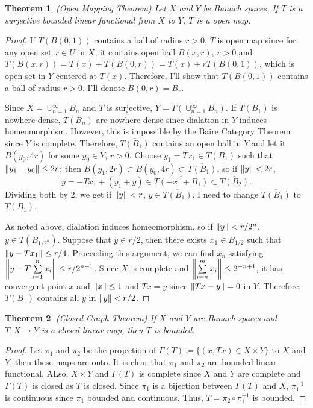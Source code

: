 \documentclass{article}
\newtheorem{theorem}{Theorem}
\begin{document}
\begin{theorem}
(Open Mapping Theorem) Let $X$ and $Y$ be Banach spaces. If $T$ is a surjective bounded linear functional from $X$ to $Y$, $T$ is a open map.
\end{theorem}
\begin{proof}
If $T(B(0, 1))$ contains a ball of radius $r>0$, $T$ is open map since for any open set $x\in U$ in $X$, it contains open ball $B(x,r)$, $r>0$ and $T(B(x,r))=T(x)+T(B(0, r))=T(x)+rT(B(0, 1))$, which is open set in $Y$ centered at $T(x)$. Therefore, I'll show that $T(B(0, 1))$ contains a ball of radius $r>0$. I'll denote $B(0,r)=B_r$.

Since $X=\cup_{n=1}^\infty B_n$ and $T$ is surjective, $Y=T(\cup_{n=1}^\infty B_n)$. If $T(B_1)$ is nowhere dense, $T(B_n)$ are nowhere dense since dialation in $Y$ induces homeomorphism. However, this is impossible by the Baire Category Theorem since $Y$ is complete. Therefore, $\overline{T(B_1)}$ contains an open ball in $Y$ and let it $B(y_0, 4r)$ for some $y_0\in Y$, $r>0$. Choose $y_1=Tx_1\in T(B_1)$ such that $\norm{y_1-y_0}\leq 2r$; then $B(y_1,2r)\subset B(y_0, 4r)\subset \overline{T(B_1)}$, so if $\norm{y}<2r$,
\begin{equation*}
y=-Tx_1+(y_1+y)\in \overline{T(-x_1+B_1)}\subset \overline{T(B_2)}.
\end{equation*}
Dividing both by $2$, we get if $\norm{y}<r$, $y\in \overline{T(B_1)}$. I need to change $\overline{T(B_1)}$ to $T(B_1)$.

As noted above, dialation induces homeomorphism, so if $\norm{y}<r/2^n$, $y\in \overline{T(B_{1/2^n})}$. Suppose that $y\in r/2$, then there exists $x_1\in B_{1/2}$ such that $\norm{y-Tx_1}\leq r/4$. Proceeding this argument, we can find $x_n$ satisfying $\norm{y-T\sum\limits_{i=1}^n x_i}\leq r/2^{n+1}$. Since $X$ is complete and $\norm{\sum\limits_{i=n}^m x_i}\leq 2^{-n+1}$, it has convergent point $x$ and $\norm{x}\leq 1$ and $Tx=y$ since $\norm{Tx-y}=0$ in $Y$. Therefore, $T(B_1)$ contains all $y$ in $\norm{y}<r/2$.
\end{proof}
\begin{theorem}
(Closed Graph Theorem) If $X$ and $Y$ are Banach spaces and $T:X\rightarrow Y$ is a closed linear map, then $T$ is bounded.
\end{theorem}
\begin{proof}
Let $\pi_1$ and $\pi_2$ be the projection of $\Gamma(T)\coloneqq\{(x, Tx)\in X\times Y\}$ to $X$ and $Y$, then these maps are onto. It is clear that $\pi_1$ and $\pi_2$ are bounded linear functional. ALso, $X\times Y$ and $\Gamma(T)$ is complete since $X$ and $Y$ are complete and $\Gamma(T)$ is closed as $T$ is closed. Since $\pi_1$ is a bijection between $\Gamma(T)$ and $X$, $\pi_1^{-1}$ is continuous since $\pi_1$ bounded and continuous. Thus, $T=\pi_2\circ \pi_1^{-1}$ is bounded.
\end{proof}
\end{document}
